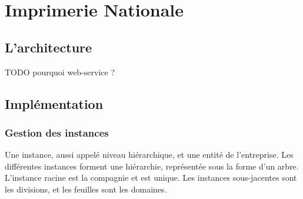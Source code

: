 \cleardoublepage

\chapter{Imprimerie Nationale}


\section{L'architecture}

TODO pourquoi web-service ?


\section{Implémentation}


\subsection{Gestion des instances}

Une instance, aussi appelé niveau hiérarchique, et une entité de l'entreprise.
Les différentes instances forment une hiérarchie, représentée sous la forme d'un arbre.
L'instance racine est la compagnie et est unique.
Les instances sous-jacentes sont les divisions, et les feuilles sont les domaines.

